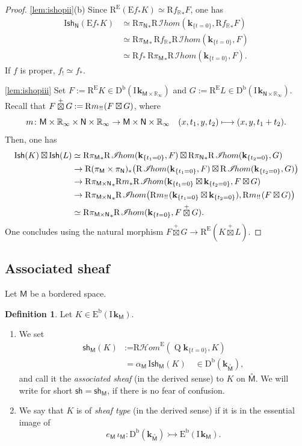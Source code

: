 \documentclass[11pt]{article}
\numberwithin{equation}{section}
\let\mathcal\mathscr
\newcommand\mto{\mathchoice{\longmapsto}{\mapsto}{\mapsto}{\mapsto}}
\newenvironment{enumeratei}
{\bgroup\def\theenumi{\roman{enumi}}\def\theenumii{\alph{enumii}}\begin{enumerate}}
{\end{enumerate}\egroup}
\newcommand{\accentset}[2]{\overset{#1}{#2}}
\newcommand{\bl}{\bigl(}
\newcommand{\br}{\bigr)}
\theoremstyle{plain}
\theoremstyle{definition}
\newtheorem{definition}[theorem]{Definition}
\newcommand{\R}{\mathbb{R}}
\newcommand{\bR}{{\R_\infty}}
\DeclareMathOperator{\quot}{Q}
\newcommand{\derived}[1]{\mathrm{#1}}
\newcommand{\derd}{\derived{D}}
\newcommand{\dere}{\derived{E}}\let\enh\dere
\newcommand{\derr}{\derived{R}}
\newcommand{\BDC}{\derd^{\mathrm{b}}}
\newcommand{\BEC}[2][\ifield]{\dere^{\mathrm{b}}(#1_{#2})}
\newcommand{\oim}[1]{#1_*}
\newcommand{\eim}[1]{#1_!}
\newcommand{\roim}[1]{\derr#1_*}
\newcommand{\reeim}[1]{\derr#1_{\mspace{1mu}!!}\mspace{1mu}}
\newcommand{\rhom}{{\derr\sheaffont{H}\!om}}
\newcommand{\fhom}{\rhom^\enh}
\newcommand{\rihom}{{\derr\mspace{2mu}\shi\!hom}}
\newcommand{\etens}[1][]{\mathbin{\boxtimes_{\raise1.5ex\hbox to-.1em{}#1}}}
\newcommand{\sheaffont}[1]{\mathcal{#1}}
\newcommand\shi{\sheaffont{I}}
\newcommand{\RE}{\operatorname{R^\enh}}
\newcommand{\Eoim}[1]{\enh#1_*}
\newcommand{\field}{\mathbf{k}}\let\cor\field
\newcommand{\ind}{\mathrm{I}\mspace{2mu}}
\newcommand{\ifield}{\ind\field}
\newcommand{\unbordered}[1]{{\accentset{\circ}{#1}}}
\newcommand{\cetens}{\mathbin{\mathop\boxtimes\limits^+}}
\newcommand{\sh}{\mathsf{sh}}
\newcommand{\Ish}{\mathrm{I}\mathsf{sh}}
\newcommand{\bbM}{\mathsf{M}}
\newcommand{\obM}{\unbordered{\bbM}}
\newcommand{\bbN}{\mathsf{N}}
\newcommand{\defeq}{\mathbin{:=}}\let \seteq\defeq
\newcommand{\st}[1]{{\{{#1}\}}}
\begin{document}
\begin{proof}
\eqref{lem:ishopii}(b)
Since $\RE(\Eoim f K) \simeq \roim{{f_\R}}F$, one has
\begin{align*}
\Ish_{\bbN}(\Eoim f K)
&\simeq \roim{{\pi_\bbN}} \rihom(\field_{\st{t=0}}, \roim{{f_\R}}F) \\
&\simeq \roim{{\pi_\bbM}}\, \roim{{f_\R}}\rihom(\field_{\st{t=0}}, F) \\
&\simeq \roim f\,\roim{{\pi_\bbM}} \rihom(\field_{\st{t=0}}, F).
\end{align*}
If $f$ is proper, $\eim f\simeq\oim f$.

\eqref{lem:ishopiii}
Set $F\defeq\RE K\in\BDC(\ifield_{\bbM\times\bR})$ and $G\defeq\RE L\in\BDC(\ifield_{\bbN\times\bR})$.
Recall that $F\cetens G \defeq \reeim m(F\etens G)$, where
\[
m\colon \bbM\times\bR \times\bbN\times\bR \to \bbM\times\bbN\times\bR \quad
(x,t_1,y,t_2)\mto (x,y,t_1+t_2).
\]
Then, one has
\begin{align*}
\Ish(K){}\etens\Ish(L)
&\simeq \roim{{\pi_\bbM}}\rihom(\field_{\st{t_1=0}}, F) \etens \roim{{\pi_\bbN}}\rihom(\field_{\st{t_2=0}}, G) \\
&\to \roim{(\pi_\bbM\times\pi_\bbN)}\bl\rihom(\field_{\st{t_1=0}}, F) \etens \rihom(\field_{\st{t_2=0}}, G)\br \\
&\to \roim{{\pi_{\bbM\times\bbN}}}\roim m\rihom(\field_{\st{t_1=0}}\etens\field_{\st{t_2=0}}, F\etens G) \\
&\to \roim{{\pi_{\bbM\times\bbN}}}\rihom\bl
\reeim m(\field_{\st{t_1=0}}\etens\field_{\st{t_2=0}}), \reeim m (F\etens G)\br \\
&\simeq \roim{{\pi_{\bbM\times\bbN}}}\rihom(\field_{\st{t=0}}, F\cetens G).
\end{align*}
One concludes using the natural morphism $F\cetens G \to \RE(K\cetens L)$.
\end{proof}

\subsection{Associated sheaf}

Let $\bbM$ be a bordered space.

\begin{definition}
Let $K\in\BEC \bbM$.
\begin{enumeratei}
\item
We set
\begin{align*}
\sh_\bbM(K) &\defeq \fhom(\quot\field_{\st{t=0}},K) \\
&= \alpha_\bbM\,\Ish_\bbM(K) \quad \in \BDC(\field_\obM),
\end{align*}
and call it the \emph{associated sheaf} (in the derived sense) to $K$ on $\obM$.
We will write for short $\sh=\sh_\bbM$, if there is no fear of confusion.
\item
We say that $K$ is of \emph{sheaf type} (in the derived sense) if it is in the essential image of
\[
e_\bbM\,\iota_\bbM\colon \BDC(\field_\obM) \rightarrowtail\BEC\bbM.
\]
\end{enumeratei}
\end{definition}
\end{document}
